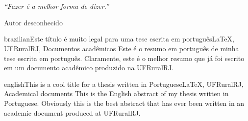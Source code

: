\documentclass[tese,header,newmargins]{UFRuralRJ}
\begin{document}
\chapter*{}
\vfill
\begin{flushright}
  {\em
  ``Fazer é a melhor forma de dizer.''
  \par
  Autor desconhecido
  }
\end{flushright}

\def\tituloportugues{Este título é muito legal para uma tese escrita em português} %
\def\chavesportugues{LaTeX, UFRuralRJ, Documentos acadêmicos} %

\generalabstracttrue %
\begin{generalabstract}{brazilian}{\tituloportugues}{\chavesportugues} %
  Este é o resumo em português de minha tese escrita em português. Claramente, 
  este é o melhor resumo que já foi escrito em um documento acadêmico produzido
  na UFRuralRJ.
\end{generalabstract}

\def\tituloingles{This is a cool title for a thesis written in Portuguese} %
\def\chavesingles{LaTeX, UFRuralRJ, Academical documents} %

\generalabstracttrue
\begin{generalabstract}{english}{\tituloingles}{\chavesingles} %
  This is the English abstract of my thesis written in Portuguese. Obviously this
  is the best abstract that has ever been written in an academic document produced
  at UFRuralRJ.
\end{generalabstract}


\listoffigures %
\end{document}
